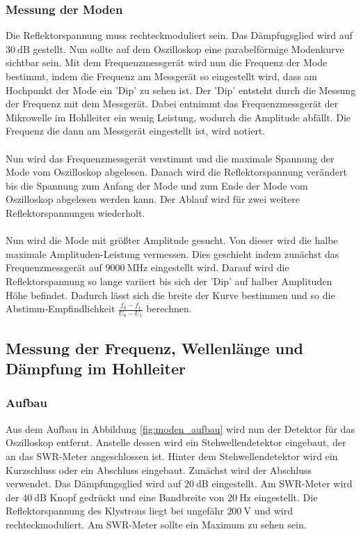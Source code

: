 \subsubsection{Messung der Moden}
\label{sec:moden_durchfuehrung}
Die Reflektorspannung muss rechteckmoduliert sein.
Das Dämpfugsglied wird auf $\SI{30}{\dB}$ gestellt.
Nun sollte auf dem Oszilloskop eine parabelförmige Modenkurve sichtbar sein.
Mit dem Frequenzmessgerät wird nun die Frequenz der Mode bestimmt, indem die Frequenz am Messgerät so eingestellt wird, dass am Hochpunkt der Mode ein 'Dip' zu sehen ist.
Der 'Dip' entsteht durch die Messung der Frequenz mit dem Messgerät.
Dabei entnimmt das Frequenzmessgerät der Mikrowelle im Hohlleiter ein wenig Leistung, wodurch die Amplitude abfällt.
Die Frequenz die dann am Messgerät eingestellt ist, wird notiert.
\\\\
Nun wird das Frequenzmessgerät verstimmt und die maximale Spannung der Mode vom Oszilloskop abgelesen.
Danach wird die Reflektorspannung verändert bis die Spannung zum Anfang der Mode und zum Ende der Mode vom Oszilloskop abgelesen werden kann.
Der Ablauf wird für zwei weitere Reflektorspannungen wiederholt.
\\\\
Nun wird die Mode mit größter Amplitude gesucht.
Von dieser wird die halbe maximale Amplituden-Leistung vermessen.
Dies geschieht indem zunächst das Frequenzmessgerät auf $\SI{9000}{\mega\Hz}$ eingestellt wird.
Darauf wird die Reflektorspannung so lange variiert bis sich der 'Dip' auf halber Amplituden Höhe befindet.
Dadurch lässt sich die breite der Kurve bestimmen und so die Abstimm-Empfindlichkeit $\frac{f_0 - f_1}{U_0 - U_1}$ berechnen.

\subsection{Messung der Frequenz, Wellenlänge und Dämpfung im Hohlleiter}
\subsubsection{Aufbau}
\label{sec:aufbau}
Aus dem Aufbau in Abbildung \ref{fig:moden_aufbau} wird nun der Detektor für das Oszilloskop entfernt.
Anstelle dessen wird ein Stehwellendetektor eingebaut, der an das SWR-Meter angeschlossen ist.
Hinter dem Stehwellendetektor wird ein Kurzschluss oder ein Abschluss eingebaut.
Zunächst wird der Abschluss verwendet.
Das Dämpfungsglied wird auf $\SI{20}{\dB}$ eingestellt.
Am SWR-Meter wird der $\SI{40}{\dB}$ Knopf gedrückt und eine Bandbreite von $\SI{20}{\Hz}$ eingestellt.
Die Reflektorspannung des Klystrons liegt bei ungefähr $\SI{200}{\V}$ und wird rechteckmoduliert.
Am SWR-Meter sollte ein Maximum zu sehen sein.

